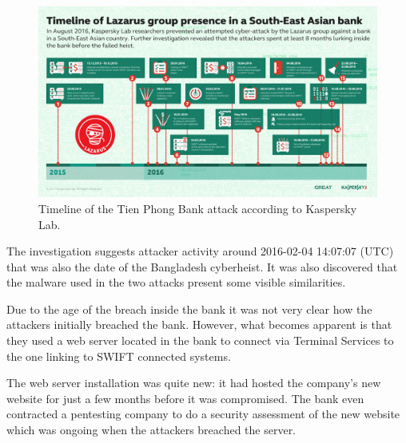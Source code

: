 \documentclass[12pt]{article}
\begin{document}
        \begin{figure}[H]
        \centering
        \includegraphics[width=\textwidth]{figures/lazarus-timeline.png}
        \caption{Timeline of the Tien Phong Bank attack according to Kaspersky Lab.}
        \label{fig:lazarustimeline}
        \end{figure}
        
        The investigation suggests attacker activity around 2016-02-04 14:07:07 (UTC) that was also the date of the Bangladesh cyberheist. It was also discovered that the malware used in the two attacks present some visible similarities. 
        
        Due to the age of the breach inside the bank it was not very clear how the attackers initially breached the bank. However, what becomes apparent is that they used a web server located in the bank to connect via Terminal Services to the one linking to SWIFT connected systems.
        
        The web server installation was quite new: it had hosted the company's new website for just a few months before it was compromised. The bank even contracted a pentesting company to do a security assessment of the new website which was ongoing when the attackers breached the server.\cite{kasperskycontenthub}
\end{document}
